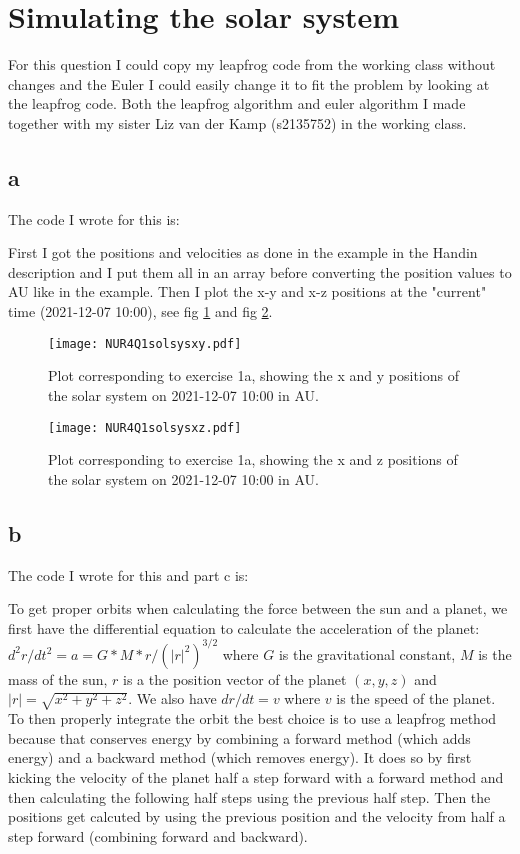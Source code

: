 \section{Simulating the solar system}

For this question I could copy my leapfrog code from the working class without changes and the Euler I could easily change it to fit the problem by looking at the leapfrog code. 
Both the leapfrog algorithm and euler algorithm I made together with my sister Liz van der Kamp (s2135752) in the working class. 

\subsection*{a}

The code I wrote for this is:


First I got the positions and velocities as done in the example in the Handin description and I put them all in an array before converting the position values to AU like in the example. Then I plot the x-y and x-z positions at the "current" time (2021-12-07 10:00), see fig \ref{fig:fig1} and fig \ref{fig:fig2}.

\begin{figure}[h!]
  \centering
  \texttt{[image: NUR4Q1solsysxy.pdf]}
  \caption{Plot corresponding to exercise 1a, showing the x and y positions of the solar system on 2021-12-07 10:00 in AU.}
  \label{fig:fig1}
\end{figure} 


\begin{figure}[h!]
  \centering
  \texttt{[image: NUR4Q1solsysxz.pdf]}
  \caption{Plot corresponding to exercise 1a, showing the x and z positions of the solar system on 2021-12-07 10:00 in AU.}
  \label{fig:fig2}
\end{figure} 


\subsection*{b}

The code I wrote for this and part c is:


To get proper orbits when calculating the force between the sun and a planet, we first have the differential equation to calculate the acceleration of the planet: $d^2r/dt^2 = a = G*M*r/(|r|^2)^{3/2}$ where $G$ is the gravitational constant, $M$ is the mass of the sun, $r$ is a the position vector of the planet $(x,y,z)$ and $|r| = \sqrt{x^2 + y^2 + z^2}$. 
We also have $dr/dt = v$ where $v$ is the speed of the planet. To then properly integrate the orbit the best choice is to use a leapfrog method because that conserves energy by combining a forward method (which adds energy) and a backward method (which removes energy). 
It does so by first kicking the velocity of the planet half a step forward with a forward method and then calculating the following half steps using the previous half step. Then the positions get calcuted by using the previous position and the velocity from half a step forward (combining forward and backward).

